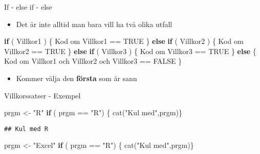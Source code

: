 \documentclass[
  11pt,
  ignorenonframetext,
]{beamer}
\newenvironment{Shaded}{\begin{snugshade}}{\end{snugshade}}
\newcommand{\ConstantTok}[1]{\textcolor[rgb]{0.00,0.00,0.00}{#1}}
\newcommand{\ControlFlowTok}[1]{\textcolor[rgb]{0.13,0.29,0.53}{\textbf{#1}}}
\newcommand{\FunctionTok}[1]{\textcolor[rgb]{0.00,0.00,0.00}{#1}}
\newcommand{\NormalTok}[1]{#1}
\newcommand{\OtherTok}[1]{\textcolor[rgb]{0.56,0.35,0.01}{#1}}
\newcommand{\SpecialCharTok}[1]{\textcolor[rgb]{0.00,0.00,0.00}{#1}}
\newcommand{\StringTok}[1]{\textcolor[rgb]{0.31,0.60,0.02}{#1}}
\providecommand{\tightlist}{%
  \setlength{\itemsep}{0pt}\setlength{\parskip}{0pt}}
\newcommand\imp[1]{\alert{\textbf{#1}}}
\begin{document}
\begin{frame}[fragile]{If - else if - else}
\protect\hypertarget{if---else-if---else}{}
\begin{itemize}
\tightlist
\item
  Det är inte alltid man bara vill ha två olika utfall
\end{itemize}

\begin{Shaded}
\begin{Highlighting}[]
\ControlFlowTok{if}\NormalTok{ ( Villkor1 ) \{}
\NormalTok{  Kod om Villkor1 }\SpecialCharTok{==} \ConstantTok{TRUE}
\NormalTok{\} }\ControlFlowTok{else} \ControlFlowTok{if}\NormalTok{ ( Villkor2 ) \{}
\NormalTok{  Kod om Villkor2 }\SpecialCharTok{==} \ConstantTok{TRUE}
\NormalTok{\} }\ControlFlowTok{else} \ControlFlowTok{if}\NormalTok{ ( Villkor3 ) \{}
\NormalTok{  Kod om Villkor3 }\SpecialCharTok{==} \ConstantTok{TRUE}
\NormalTok{\} }\ControlFlowTok{else}\NormalTok{ \{}
\NormalTok{  Kod om Villkor1 och Villkor2 och Villkor3 }\SpecialCharTok{==} \ConstantTok{FALSE}
\NormalTok{\}}
\end{Highlighting}
\end{Shaded}

\begin{itemize}
\tightlist
\item
  Kommer välja den \imp{första} som är sann
\end{itemize}
\end{frame}

\begin{frame}[fragile]{Villkorssatser - Exempel}
\protect\hypertarget{villkorssatser---exempel}{}
\begin{Shaded}
\begin{Highlighting}[]
\NormalTok{prgm }\OtherTok{\textless{}{-}} \StringTok{"R"}
\ControlFlowTok{if}\NormalTok{ ( prgm }\SpecialCharTok{==} \StringTok{"R"}\NormalTok{) \{ }\FunctionTok{cat}\NormalTok{(}\StringTok{"Kul med"}\NormalTok{,prgm)\}}
\end{Highlighting}
\end{Shaded}

\pause

\begin{verbatim}
## Kul med R
\end{verbatim}

\pause

\begin{Shaded}
\begin{Highlighting}[]
\NormalTok{prgm }\OtherTok{\textless{}{-}} \StringTok{"Excel"}
\ControlFlowTok{if}\NormalTok{ ( prgm }\SpecialCharTok{==} \StringTok{"R"}\NormalTok{) \{ }\FunctionTok{cat}\NormalTok{(}\StringTok{"Kul med"}\NormalTok{,prgm)\}}
\end{Highlighting}
\end{Shaded}
\end{frame}
\end{document}
